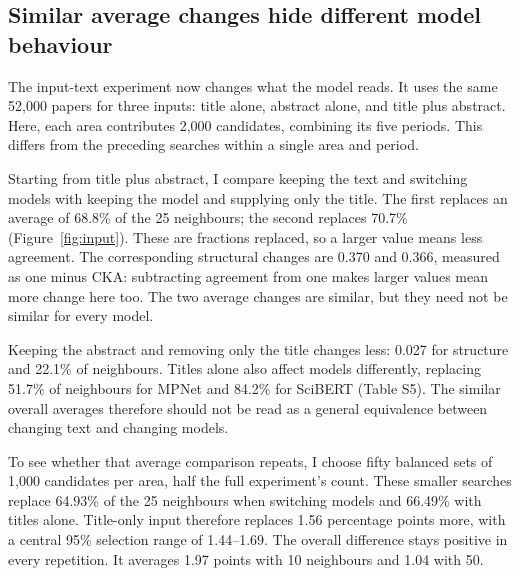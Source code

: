 \documentclass[12pt]{article}
\begin{document}
\FloatBarrier
\subsection{Similar average changes hide different model behaviour}
The input-text experiment now changes what the model reads. It uses the same 52,000 papers for three inputs: title alone, abstract alone, and title plus abstract. Here, each area contributes 2,000 candidates, combining its five periods. This differs from the preceding searches within a single area and period.

Starting from title plus abstract, I compare keeping the text and switching models with keeping the model and supplying only the title. The first replaces an average of 68.8\% of the 25 neighbours; the second replaces 70.7\% (Figure~\ref{fig:input}). These are fractions replaced, so a larger value means less agreement. The corresponding structural changes are 0.370 and 0.366, measured as one minus CKA: subtracting agreement from one makes larger values mean more change here too. The two average changes are similar, but they need not be similar for every model.

Keeping the abstract and removing only the title changes less: 0.027 for structure and 22.1\% of neighbours. Titles alone also affect models differently, replacing 51.7\% of neighbours for MPNet and 84.2\% for SciBERT (Table S5). The similar overall averages therefore should not be read as a general equivalence between changing text and changing models.

To see whether that average comparison repeats, I choose fifty balanced sets of 1,000 candidates per area, half the full experiment's count. These smaller searches replace 64.93\% of the 25 neighbours when switching models and 66.49\% with titles alone. Title-only input therefore replaces 1.56 percentage points more, with a central 95\% selection range of 1.44--1.69. The overall difference stays positive in every repetition. It averages 1.97 points with 10 neighbours and 1.04 with 50.
\end{document}
